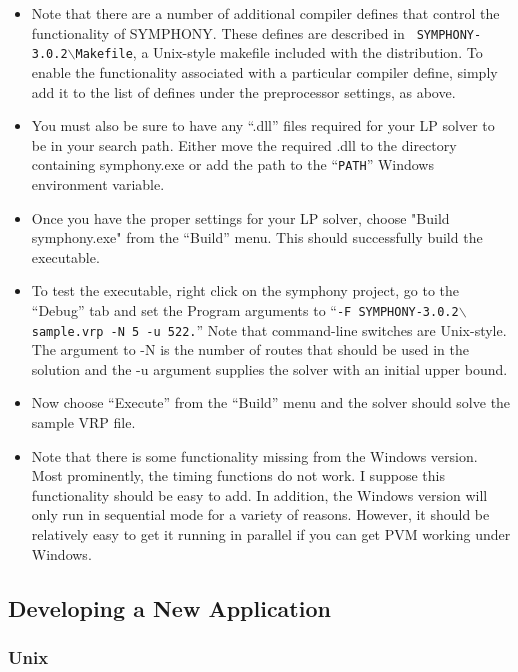 \begin{itemize}
\begin{itemize}
\end{itemize}

\item Note that there are a number of additional compiler defines that control
the functionality of SYMPHONY. These defines are described in {\tt
SYMPHONY-3.0.2$\backslash$Makefile}, a Unix-style makefile included with the
distribution. To enable the functionality associated with a particular
compiler define, simply add it to the list of defines under the preprocessor
settings, as above.

\item You must also be sure to have any ``.dll'' files required for your LP 
solver to be in your search path. Either move the required .dll to the
directory containing symphony.exe or add the path to the ``{\tt PATH}''
Windows environment variable.

\item Once you have the proper settings for your LP solver, choose "Build
symphony.exe" from the ``Build'' menu. This should successfully build the
executable.

\item To test the executable, right click on the symphony project, go to the
``Debug'' tab and set the Program arguments to ``{\tt -F
SYMPHONY-3.0.2$\backslash$sample.vrp -N 5 -u 522.}'' Note that command-line
switches are Unix-style. The argument to -N is the number of routes that
should be used in the solution and the -u argument supplies the solver with an
initial upper bound.

\item Now choose ``Execute'' from the ``Build'' menu and the solver should 
solve the sample VRP file.

\item Note that there is some functionality missing from the Windows
version. Most prominently, the timing functions do not work. I suppose this
functionality should be easy to add. In addition, the Windows
version will only run in sequential mode for a variety of reasons. However, it
should be relatively easy to get it running in parallel if you can get PVM
working under Windows.

\end{itemize}

\subsection{Developing a New Application}

\subsubsection{Unix}

